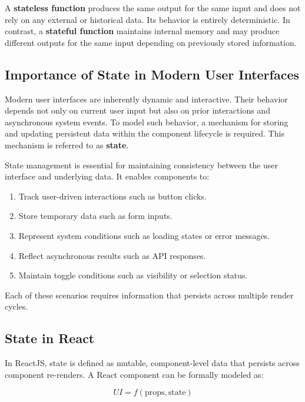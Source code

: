 \documentclass[12pt, a4paper]{report}
\begin{document}
     A \textbf{stateless function} produces the same output for the same input and does not rely on any external or historical data. Its behavior is entirely deterministic. In contrast, a \textbf{stateful function} maintains internal memory and may produce different outputs for the same input depending on previously stored information.

     \subsection{Importance of State in Modern User Interfaces}

     Modern user interfaces are inherently dynamic and interactive. Their behavior depends not only on current user input but also on prior interactions and asynchronous system events. To model such behavior, a mechanism for storing and updating persistent data within the component lifecycle is required. This mechanism is referred to as \textbf{state}.

     State management is essential for maintaining consistency between the user interface and underlying data. It enables components to:

     \begin{enumerate}
         \item Track user-driven interactions such as button clicks.
         \item Store temporary data such as form inputs.
         \item Represent system conditions such as loading states or error messages.
         \item Reflect asynchronous results such as API responses.
         \item Maintain toggle conditions such as visibility or selection status.
     \end{enumerate}

     Each of these scenarios requires information that persists across multiple render cycles.

     \subsection{State in React}

     In ReactJS, state is defined as mutable, component-level data that persists across component re-renders. A React component can be formally modeled as:

     \[
     UI = f(\text{props}, \text{state})
     \]
\end{document}

